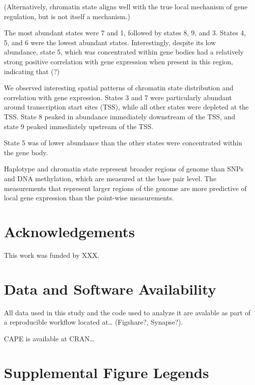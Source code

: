 \documentclass[10pt,letterpaper]{article}
\begin{document}
(Alternatively, chromatin state aligns well with the true local
mechanism of gene regulation, but is not itself a mechanism.)

The most abundant states were 7 and 1, followed by states 8, 9, and 3.
States 4, 5, and 6 were the lowest abundant states. Interestingly,
despite its low abundance, state 5, which was concentrated within gene
bodies had a relatively strong positive correlation with gene expression
when present in this region, indicating that (?)

We observed interesting spatial patterns of chromatin state distribution
and correlation with gene expression. States 3 and 7 were particularly
abundant around transcription start sites (TSS), while all other states
were depleted at the TSS. State 8 peaked in abundance immediately
downstream of the TSS, and state 9 peaked immediately upstream of the
TSS.

State 5 was of lower abundance than the other states were concentrated
within the gene body.

Haplotype and chromatin state represent broader regions of genome than
SNPs and DNA methylation, which are measured at the base pair level. The
measurements that represent larger regions of the genome are more
predictive of local gene expression than the point-wise measurements.

\hypertarget{acknowledgements}{%
\section{Acknowledgements}\label{acknowledgements}}

This work was funded by XXX.

\hypertarget{data-and-software-availability}{%
\section{Data and Software
Availability}\label{data-and-software-availability}}

All data used in this study and the code used to analyze it are avalable
as part of a reproducible workflow located at\ldots{} (Figshare?,
Synapse?).

CAPE is available at CRAN\ldots{}

\hypertarget{supplemental-figure-legends}{%
\section{Supplemental Figure
Legends}\label{supplemental-figure-legends}}
\end{document}
